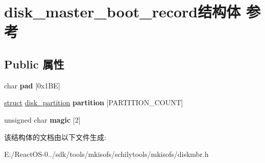 \hypertarget{structdisk__master__boot__record}{}\section{disk\+\_\+master\+\_\+boot\+\_\+record结构体 参考}
\label{structdisk__master__boot__record}
\subsection*{Public 属性}
\begin{DoxyCompactItemize}
\item 
\mbox{\label{structdisk__master__boot__record_ade76318559bb733d369db31d9a29e61a}} 
char {\bfseries pad} \mbox{[}0x1\+B\+E\mbox{]}
\item 
\mbox{\label{structdisk__master__boot__record_a435633181f09ff0b3e54073c668ddafa}} 
\hyperlink{interfacestruct}{struct} \hyperlink{structdisk__partition}{disk\+\_\+partition} {\bfseries partition} \mbox{[}P\+A\+R\+T\+I\+T\+I\+O\+N\+\_\+\+C\+O\+U\+NT\mbox{]}
\item 
\mbox{\label{structdisk__master__boot__record_a945d88e6bb5ba655fb143dc760956336}} 
unsigned char {\bfseries magic} \mbox{[}2\mbox{]}
\end{DoxyCompactItemize}


该结构体的文档由以下文件生成\+:\begin{DoxyCompactItemize}
\item 
E\+:/\+React\+O\+S-\/0../sdk/tools/mkisofs/schilytools/mkisofs/diskmbr.\+h\end{DoxyCompactItemize}

